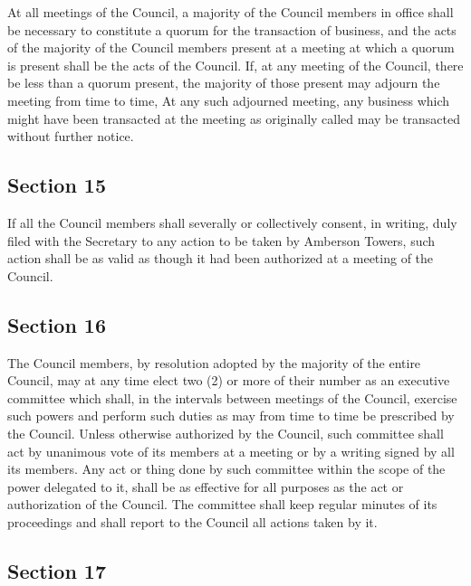 \documentclass[
  14pt,
]{book}
\begin{document}
At all meetings of the Council, a majority of the Council members in office shall be necessary to constitute a quorum for the transaction of business, and the acts of the majority of the Council members present at a meeting at which a quorum is present shall be the acts of the Council. If, at any meeting of the Council, there be less than a quorum present, the majority of those present may adjourn the meeting from time to time, At any such adjourned meeting, any business which might have been transacted at the meeting as originally called may be transacted without further notice.

\hypertarget{section-15}{%
\subsection*{Section 15}\label{section-15}}

If all the Council members shall severally or collectively consent, in writing, duly filed with the Secretary to any action to be taken by Amberson Towers, such action shall be as valid as though it had been authorized at a meeting of the Council.

\hypertarget{section-16}{%
\subsection*{Section 16}\label{section-16}}

The Council members, by resolution adopted by the majority of the entire Council, may at any time elect two (2) or more of their number as an executive committee which shall, in the intervals between meetings of the Council, exercise such powers and perform such duties as may from time to time be prescribed by the Council. Unless otherwise authorized by the Council, such committee shall act by unanimous vote of its members at a meeting or by a writing signed by all its members. Any act or thing done by such committee within the scope of the power delegated to it, shall be as effective for all purposes as the act or authorization of the Council. The committee shall keep regular minutes of its proceedings and shall report to the Council all actions taken by it.

\hypertarget{section-17}{%
\subsection*{Section 17}\label{section-17}}
\end{document}
